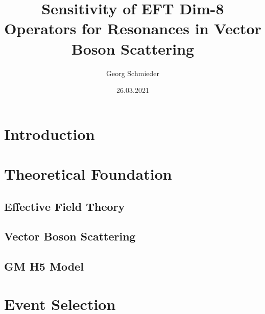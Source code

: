 \documentclass[english]{tudscrreprt}
\begin{document}
\date{26.03.2021}
\author{Georg Schmieder}
\title{Sensitivity of EFT Dim-8 Operators for Resonances in Vector Boson Scattering}
\maketitle

\tableofcontents

\pagebreak
\chapter{Introduction}
    

\pagebreak
\chapter{Theoretical Foundation}
    \section{Effective Field Theory}
        
    \pagebreak
    \section{Vector Boson Scattering}
        

    \pagebreak
    \section{GM H5 Model}
        
        
\pagebreak
\chapter{Event Selection}
    
\end{document}
